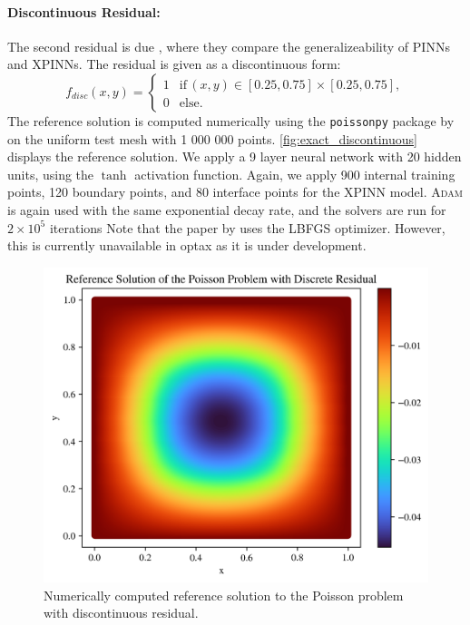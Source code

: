 \paragraph{Discontinuous Residual:}
The second residual is due \cite{XPINN_generalize}, where they compare the generalizeability of PINNs and XPINNs. The residual is given as a discontinuous form:
\begin{equation*}
    f_{disc}(x,y)=
    \begin{cases}
        1 &\text{if} \, (x,y)\in [0.25,0.75]\times[0.25,0.75], \\
        0 &\text{else}.
        \label{eq:discontinuous_poisson}
    \end{cases}
\end{equation*}
The reference solution is computed numerically using the \verb|poissonpy| package by \cite{poissonpy} on the uniform test mesh with 1 000 000 points.
\autoref{fig:exact_discontinuous} displays the reference solution.
We apply a 9 layer neural network with 20 hidden units, using the $\tanh$ activation function.
Again, we apply 900 internal training points, 120 boundary points, and 80 interface points for the XPINN model.
\textsc{Adam} is again used with the same exponential decay rate, and the solvers are run for $2\times 10^5$ iterations
Note that the paper by \textcite{XPINN_generalize} uses the LBFGS optimizer.
However, this is currently unavailable in optax as it is under development.

\begin{figure}
    \centering
    \includegraphics[width = \linewidth]{Project1XPINNs/figures/Poisson/Exact_Discrete.png}
    \caption{Numerically computed reference solution to the Poisson problem with discontinuous residual.}
    \label{fig:exact_discontinuous}
\end{figure}

